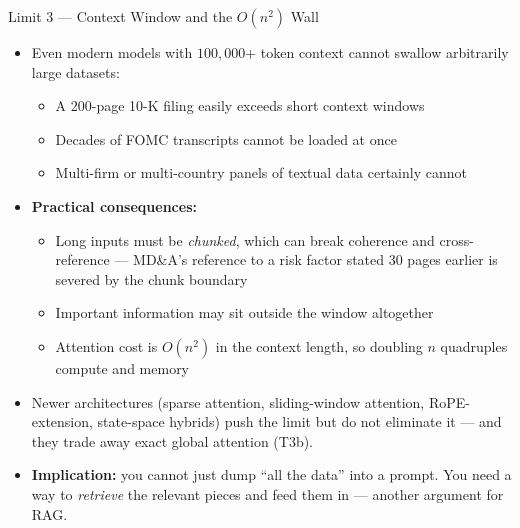 \begin{frame}{Limit 3 --- Context Window and the $O(n^2)$ Wall}
\begin{itemize}
\item Even modern models with $100{,}000$+ token context cannot swallow arbitrarily large datasets:
\begin{itemize}
    \item A 200-page 10-K filing easily exceeds short context windows
    \item Decades of FOMC transcripts cannot be loaded at once
    \item Multi-firm or multi-country panels of textual data certainly cannot
\end{itemize}

\medskip
\item \textbf{Practical consequences:}
\begin{itemize}
    \item Long inputs must be \emph{chunked}, which can break coherence and cross-reference --- MD\&A's reference to a risk factor stated 30 pages earlier is severed by the chunk boundary
    \item Important information may sit outside the window altogether
    \item Attention cost is $O(n^2)$ in the context length, so doubling $n$ quadruples compute and memory
\end{itemize}

\medskip
\item Newer architectures (sparse attention, sliding-window attention, RoPE-extension, state-space hybrids) push the limit but do not eliminate it --- and they trade away exact global attention (T3b).

\medskip
\item \textbf{Implication:} you cannot just dump ``all the data'' into a prompt. You need a way to \emph{retrieve} the relevant pieces and feed them in --- another argument for RAG.
\end{itemize}
\end{frame}

